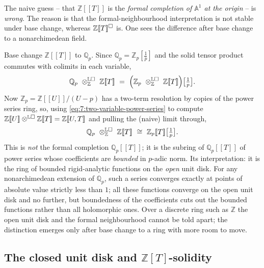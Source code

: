 The naive guess -- that $\mathbb{Z}[\![T]\!]$ is the \emph{formal completion
of $\mathbb{A}^1$ at the origin} -- is \emph{wrong}. The reason is that the
formal-neighbourhood interpretation is not stable under base change, whereas
$\mathbb{Z}[\![T]\!]^{\square}$ is. One sees the difference after base change to
a nonarchimedean field.

\begin{example}
\label{ex:7:open-disk-Qp}
Base change $\mathbb{Z}[\![T]\!]$ to $\mathbb{Q}_p$. Since
$\mathbb{Q}_p=\mathbb{Z}_p[\tfrac1p]$ and the solid tensor product commutes
with colimits in each variable,
\begin{equation*}
\mathbb{Q}_p\ \otimes^{\mathbb{L}\solid}_{\mathbb{Z}}\ \mathbb{Z}[\![T]\!]
\ =\ \Bigl(\mathbb{Z}_p\ \otimes^{\mathbb{L}\solid}_{\mathbb{Z}}\
\mathbb{Z}[\![T]\!]\Bigr)\bigl[\tfrac1p\bigr].
\end{equation*}
Now $\mathbb{Z}_p=\mathbb{Z}[\![U]\!]/(U-p)$ has a two-term resolution by
copies of the power series ring, so, using
\eqref{eq:7:two-variable-power-series} to compute
$\mathbb{Z}[\![U]\!]\otimes^{\mathbb{L}\square}\mathbb{Z}[\![T]\!]
=\mathbb{Z}[\![U,T]\!]$ and pulling the (naive) limit through,
\begin{equation*}
\mathbb{Q}_p\ \otimes^{\mathbb{L}\solid}_{\mathbb{Z}}\ \mathbb{Z}[\![T]\!]
\ \cong\ \mathbb{Z}_p[\![T]\!]\bigl[\tfrac1p\bigr].
\end{equation*}
This is \emph{not} the formal completion $\mathbb{Q}_p[\![T]\!]$; it is the
subring of $\mathbb{Q}_p[\![T]\!]$ of power series whose coefficients are
\emph{bounded} in $p$-adic norm. Its interpretation: it is the ring of bounded
rigid-analytic functions on the \emph{open} unit disk. For any nonarchimedean
extension of $\mathbb{Q}_p$, such a series converges exactly at points of
absolute value strictly less than $1$; all these functions converge on the
open unit disk and no further, but boundedness of the coefficients cuts out the
bounded functions rather than all holomorphic ones. Over a discrete ring such
as $\mathbb{Z}$ the open unit disk and the formal neighbourhood cannot be told
apart; the distinction emerges only after base change to a ring with more room
to move.
\end{example}

\subsection{The closed unit disk and \texorpdfstring{$\mathbb{Z}[T]$}{Z[T]}-solidity}


